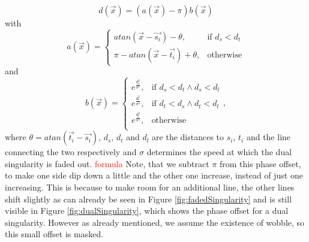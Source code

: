 \documentclass{utue} %
\begin{document}
$$
d(\vec{x}) = (a(\vec{x})-\pi)b(\vec{x})
$$
with
$$
  a(\vec{x}) = \begin{cases}
  atan(\vec{x}-\vec{s_i}) - \theta, &\text{if }d_s < d_t\\
  \pi - atan(\vec{x}-\vec{t_i}) + \theta, &\text{otherwise}
  \end{cases}
$$
and
$$
  b(\vec{x}) = \begin{cases}
    e^{\frac{d_s^2}{\sigma^2}}, &\text{if }d_s < d_t \land d_s < d_l\\
    e^{\frac{d_t^2}{\sigma^2}}, &\text{if }d_t < d_s \land d_t < d_l\\
    e^{\frac{d_l^2}{\sigma^2}}, &\text{otherwise}\\
  \end{cases},
$$
where $\theta=atan(\vec{t_i}-\vec{s_i})$, $d_s$, $d_t$ and $d_l$ are the distances to $s_i$, $t_i$ and the line connecting the two respectively and $\sigma$ determines the speed at which the dual singularity is faded out.
\textcolor{red}{formula}
Note, that we subtract $\pi$ from this phase offset, to make one side dip down a little and the other one increase, instead of just one increasing. This is because to make room for an additional line, the other lines shift slightly as can already be seen in Figure \ref{fig:fadedSingularity} and is still visible in Figure \ref{fig:dualSingularity}, which shows the phase offset for a dual singularity. However as already mentioned, we assume the existence of wobble, so this small offset is masked.
\end{document}

